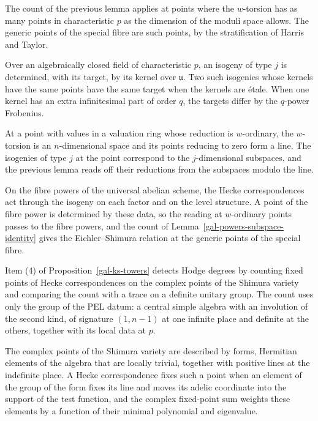 The count of the previous lemma applies at points where the $w$-torsion has as many points in
characteristic $p$ as the dimension of the moduli space allows. The generic points of the special fibre
are such points, by the stratification of Harris and Taylor.

Over an algebraically closed field of characteristic $p$, an isogeny of type $j$ is determined, with its
target, by its kernel over $\mathfrak u$. Two such isogenies whose kernels have the same points have
the same target when the kernels are \'etale. When one kernel has an extra infinitesimal part of order
$q$, the targets differ by the $q$-power Frobenius.

At a point with values in a valuation ring whose reduction is $w$-ordinary, the $w$-torsion is an
$n$-dimensional space and its points reducing to zero form a line. The isogenies of type $j$ at the
point correspond to the $j$-dimensional subspaces, and the previous lemma reads off their reductions
from the subspaces modulo the line.

On the fibre powers of the universal abelian scheme, the Hecke correspondences act through the isogeny on
each factor and on the level structure. A point of the fibre power is determined by these data, so the
reading at $w$-ordinary points passes to the fibre powers, and the count of
Lemma~\ref{gal-powers-subspace-identity} gives the Eichler--Shimura relation at the generic points of
the special fibre.

Item (4) of Proposition~\ref{gal-ks-towers} detects Hodge degrees by counting fixed points of Hecke
correspondences on the complex points of the Shimura variety and comparing the count with a trace on a
definite unitary group. The count uses only the group of the PEL datum: a central simple algebra with
an involution of the second kind, of signature $(1,n-1)$ at one infinite place and definite at the
others, together with its local data at $p$.

The complex points of the Shimura variety are described by forms, Hermitian elements of the algebra
that are locally trivial, together with positive lines at the indefinite place. A Hecke correspondence
fixes such a point when an element of the group of the form fixes its line and moves its adelic
coordinate into the support of the test function, and the complex fixed-point sum weights these
elements by a function of their minimal polynomial and eigenvalue.

